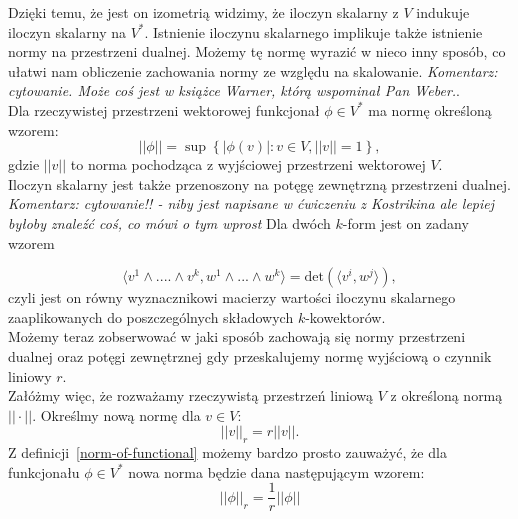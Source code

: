 \documentclass[licencjacka]{pracamgr}
\theoremstyle{definition}
\theoremstyle{definition}
\theoremstyle{plain}
\theoremstyle{plain}
\theoremstyle{plain}
\theoremstyle{plain}
\begin{document}
Dzięki temu, że jest on izometrią widzimy, że iloczyn skalarny z $V$
indukuje iloczyn skalarny na $V^\ast$.  Istnienie iloczynu skalarnego
implikuje także istnienie normy na przestrzeni dualnej. Możemy tę
normę wyrazić w nieco inny sposób, co ułatwi nam obliczenie zachowania
normy ze względu na skalowanie.  \emph{Komentarz: cytowanie. Może coś
  jest w książce Warner, którą wspominał Pan Weber.}. \\

Dla rzeczywistej przestrzeni wektorowej funkcjonał $\phi \in V^\ast$ ma
normę określoną wzorem:
\begin{equation}\label{norm-of-functional}
||\phi|| = \sup \left\{ |\phi(v)|: v \in V, ||v|| = 1 \right\},
\end{equation}
gdzie $||v||$ to norma pochodząca z wyjściowej przestrzeni wektorowej $V$.  \\


Iloczyn skalarny jest także przenoszony na potęgę zewnętrzną przestrzeni
dualnej. \emph{Komentarz: cytowanie!! - niby jest napisane w ćwiczeniu z
Kostrikina ale lepiej byłoby znaleźć coś, co mówi o tym wprost} Dla dwóch
$k$-form jest on zadany wzorem

\begin{equation} \langle v^1 \wedge ....\wedge v^k, w^1 \wedge ... \wedge w^k
\rangle = \text{det} \left( \langle v^i, w^j \rangle \right), 
\end{equation}
czyli jest on równy wyznacznikowi macierzy wartości iloczynu skalarnego
zaaplikowanych do poszczególnych składowych $k$-kowektorów.  \\

Możemy teraz zobserwować w jaki sposób zachowają się normy 
przestrzeni dualnej oraz potęgi zewnętrznej gdy przeskalujemy normę wyjściową
o czynnik liniowy $r$. \\

Załóżmy więc, że rozważamy rzeczywistą przestrzeń liniową $V$ z określoną
normą $|| \cdot ||$. Określmy nową normę dla $v \in V$:
\[
|| v ||_r = r || v ||.
\]
Z definicji~\ref{norm-of-functional} możemy bardzo prosto zauważyć, że
dla funkcjonału $\phi \in V^\ast$ nowa norma będzie dana następującym
wzorem:
\[
|| \phi ||_r = \frac{1}{r} ||\phi ||
\]
\end{document}
